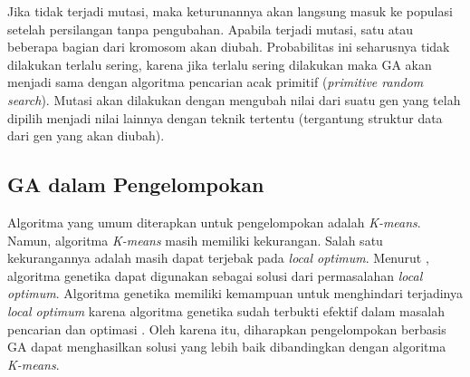 Jika tidak terjadi mutasi, maka keturunannya akan langsung masuk ke populasi setelah persilangan tanpa pengubahan. Apabila terjadi mutasi, satu atau beberapa bagian dari kromosom akan diubah. Probabilitas ini seharusnya tidak dilakukan terlalu sering, karena jika terlalu sering dilakukan maka GA akan menjadi sama dengan algoritma pencarian acak primitif (\textit{primitive random search}). Mutasi akan dilakukan dengan mengubah nilai dari suatu gen yang telah dipilih menjadi nilai lainnya dengan teknik tertentu (tergantung struktur data dari gen yang akan diubah).



\subsection{GA dalam Pengelompokan}
Algoritma yang umum diterapkan untuk pengelompokan adalah \textit{K-means}. Namun, algoritma \textit{K-means} masih memiliki kekurangan. Salah satu kekurangannya adalah masih dapat terjebak pada \textit{local optimum}. Menurut \cite{maulik2000genetic}, algoritma genetika dapat digunakan sebagai solusi dari permasalahan \textit{local optimum}. Algoritma genetika memiliki kemampuan untuk menghindari terjadinya \textit{local optimum} karena algoritma genetika sudah terbukti efektif dalam masalah pencarian dan optimasi \cite{srinivas1994genetic}. Oleh karena itu, diharapkan pengelompokan berbasis GA dapat menghasilkan solusi yang lebih baik dibandingkan dengan algoritma \textit{K-means}.

